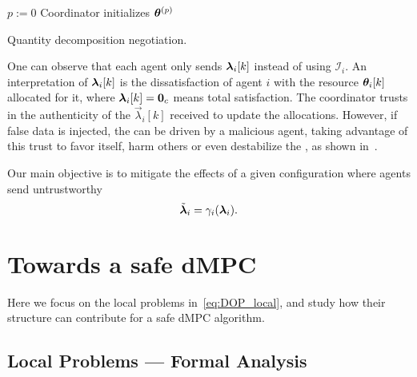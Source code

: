 \documentclass{ifacconf}  %
\begin{document}
\begin{algorithm2e}[h]
  \DontPrintSemicolon%
  $p:=0$\;
  Coordinator initializes $\boldsymbol{\theta}^{(p)}$ \;
 \caption{Quantity decomposition negotiation.}\label{alg:quantityAlg}
\end{algorithm2e}

One can observe that each agent only sends $\lambdaik$ instead of using $\mathcal{I}_{i}$.
An interpretation of $\lambdaik$ is the dissatisfaction of agent $i$ with the resource $\thetaik$ allocated for it, where ${\lambdaik=\0_{c}}$ means total satisfaction.
The coordinator trusts in the authenticity of the $\vec{\lambda}_{i}[k]$ received to update the allocations. However, if false data is injected, the \negotiation{} can be driven by a malicious agent, taking advantage of this trust to favor itself, harm others or even destabilize the \negotiation{}, as shown in~\cite{NogueiraEtAl2021}.


Our main objective is to mitigate the effects of a given configuration where agents send untrustworthy
\begin{equation*}
\tilde{\boldsymbol{\lambda}}_i=\gamma_{i}(\boldsymbol{\lambda}_i).
\end{equation*}

\section{Towards a safe dMPC}\label{sec:TSM}

Here we focus on the local problems in~\eqref{eq:DOP_local}, and study how their structure can contribute for a safe dMPC algorithm.

\subsection{Local Problems --- Formal Analysis}\label{ssec:FA}
\end{document}
